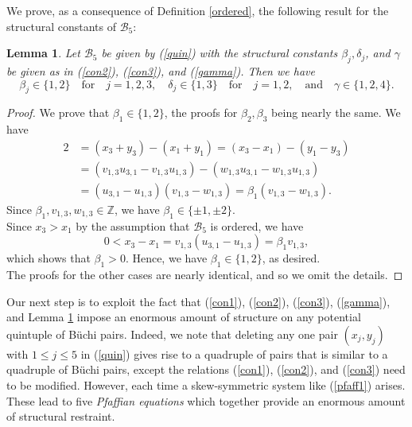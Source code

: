 \documentclass[letterpaper,10pt]{amsart}
\newcommand{\bZ}{{\mathbb{Z}}}
\newcommand{\B}{{\mathcal{B}}}
\newtheorem{lemma}[theorem]{Lemma}
\theoremstyle{definition}
\numberwithin{equation}{section}
\begin{document}
We prove, as a consequence of Definition \ref{ordered}, the following result for the structural constants of $\B_5$: 

\begin{lemma} \label{ordlem2} Let $\B_5$ be given by (\ref{quin}) with the structural constants $\beta_j, \delta_j$, and $\gamma$ be given as in (\ref{con2}), (\ref{con3}), and (\ref{gamma}). Then we have 
\begin{equation} \label{strucon} \beta_j \in \{1,2\} \quad \text{for} \quad j = 1,2,3, \quad \delta_j \in \{1,3\} \quad \text{for} \quad j = 1,2, \quad \text{and} \quad \gamma \in \{1,2,4\}.
\end{equation}
\end{lemma}

\begin{proof} We prove that $\beta_1 \in \{1,2\}$, the proofs for $\beta_2, \beta_3$ being nearly the same. We have 
\begin{align*} 2 & = (x_3 + y_3) - (x_1 + y_1) = (x_3 - x_1) - (y_1 - y_3) \\
& = (v_{1,3} u_{3,1} - v_{1,3} u_{1,3}) - (w_{1,3} u_{3,1} - w_{1,3} u_{1,3}) \\
& = (u_{3,1} - u_{1,3})(v_{1,3} - w_{1,3}) = \beta_1 (v_{1,3} - w_{1,3}).
\end{align*}
Since $\beta_1, v_{1,3}, w_{1,3} \in \bZ$, we have $\beta_1 \in \{\pm 1, \pm 2\}$. \\

Since $x_3 > x_1$ by the assumption that $\B_5$ is ordered, we have 
\[0 < x_3 - x_1 = v_{1,3}(u_{3,1} - u_{1,3}) = \beta_1 v_{1,3},\]
which shows that $\beta_1 > 0$. Hence, we have $\beta_1 \in \{1,2\}$, as desired. \\

The proofs for the other cases are nearly identical, and so we omit the details. \end{proof}


Our next step is to exploit the fact that (\ref{con1}), (\ref{con2}), (\ref{con3}), (\ref{gamma}), and Lemma \ref{ordlem2} impose an enormous amount of structure on any potential quintuple of B\"{u}chi pairs. Indeed, we note that deleting any one pair $(x_j, y_j)$ with $1 \leq j \leq 5$ in (\ref{quin}) gives rise to a quadruple of pairs that is similar to a quadruple of B\"{u}chi pairs, except the relations (\ref{con1}), (\ref{con2}), and (\ref{con3}) need to be modified. However, each time a skew-symmetric system like (\ref{pfaff1}) arises. These lead to five \emph{Pfaffian equations} which together provide an enormous amount of structural restraint. \\
\end{document}
